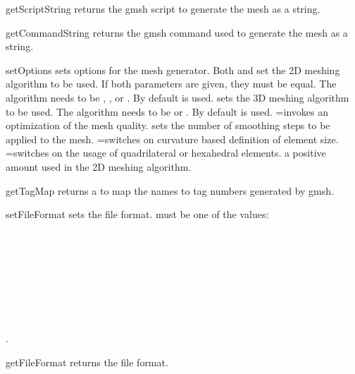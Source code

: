 \begin{methoddesc}[Design]{getScriptString}{}
returns the gmsh script to generate the mesh as a string.
\end{methoddesc}

\begin{methoddesc}[Design]{getCommandString}{}
returns the gmsh command used to generate the mesh as a string.
\end{methoddesc}

\begin{methoddesc}[Design]{setOptions}{
}
sets options for the mesh generator.
Both  and  set the 2D meshing algorithm to be
used. If both parameters are given, they must be equal.
The algorithm needs to be , ,
or . By default  is used.
 sets the 3D  meshing algorithm to be used.
The algorithm needs to be  or .
By default  is used.
=\True invokes an optimization of the mesh quality.
 sets the number of smoothing steps to be applied to the mesh.
=\True switches on curvature based
definition of element size.
=\True switches on the usage of quadrilateral or
hexahedral elements.
 a positive amount used in the 2D meshing algorithm.
\end{methoddesc}

\begin{methoddesc}[Design]{getTagMap}{}
returns a  to map the  names to tag numbers
generated by gmsh.
\end{methoddesc}

\begin{methoddesc}[Design]{setFileFormat}{}
sets the file format.  must be one of the values:\\
\\
\\
\\
\\
\\
\\
\\
\\
.
\end{methoddesc}

\begin{methoddesc}[Design]{getFileFormat}{}
returns the file format.
\end{methoddesc}

